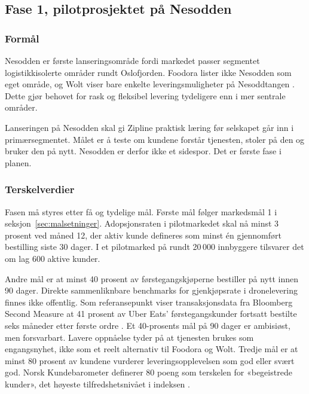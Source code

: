 \subsection{Fase 1, pilotprosjektet på Nesodden}

\subsubsection{Formål}

Nesodden er første lanseringsområde fordi markedet passer segmentet
logistikkisolerte områder rundt Oslofjorden. Foodora lister ikke
Nesodden som eget område, og Wolt viser bare enkelte
leveringsmuligheter på Nesoddtangen
\parencite{foodora2026_byer, wolt2026_nesoddtangen}. Dette gjør behovet for
rask og fleksibel levering tydeligere enn i mer sentrale områder.

Lanseringen på Nesodden skal gi Zipline praktisk læring før selskapet går inn
i primærsegmentet. Målet er å teste om kundene forstår tjenesten, stoler på
den og bruker den på nytt. Nesodden er derfor ikke et sidespor. Det er første
fase i planen.

\subsubsection{Terskelverdier}

Fasen må styres etter få og tydelige mål. Første mål følger markedsmål 1
i seksjon~\ref{sec:malsetninger}. Adopsjonsraten i pilotmarkedet skal nå
minst 3 prosent ved måned 12, der aktiv kunde defineres som minst én
gjennomført bestilling siste 30 dager. I et pilotmarked på rundt
20\,000 innbyggere tilsvarer det om lag 600 aktive kunder.

Andre mål er at minst 40 prosent av førstegangskjøperne bestiller på nytt
innen 90 dager. Direkte sammenliknbare benchmarks for gjenkjøpsrate i
dronelevering finnes ikke offentlig. Som referansepunkt viser
transaksjonsdata fra Bloomberg Second Measure at 41 prosent av Uber Eats'
førstegangskunder fortsatt bestilte seks måneder etter første ordre
\parencite{secondmeasure2018}. Et 40-prosents mål på 90 dager er ambisiøst,
men forsvarbart. Lavere oppnåelse tyder på at tjenesten brukes som
engangsnyhet, ikke som et reelt alternativ til Foodora og Wolt. Tredje mål
er at minst 80 prosent av kundene vurderer leveringsopplevelsen som god
eller svært god. Norsk Kundebarometer definerer 80 poeng som terskelen for
«begeistrede kunder», det høyeste tilfredshetsnivået i indeksen
\parencite{bi_kundebarometer2024}.

